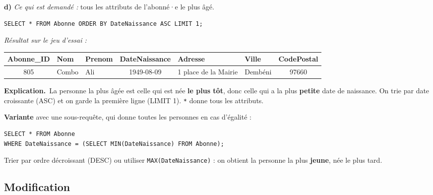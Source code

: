 \documentclass[11pt, a4paper]{exam}
\newcommand{\code}[1]{\texttt{#1}}
\newcommand{\rappel}[1]{\noindent\textit{Ce qui est demandé :} #1\par\smallskip}
\newcommand{\explication}{\noindent\textbf{Explication.}\ }
\newcommand{\sql}[1]{\textsc{#1}}
\newcommand{\resultat}[1]{\par\smallskip\noindent\textit{Résultat sur le jeu d'essai :}\par\nopagebreak\begin{center}\footnotesize #1\end{center}}
\begin{document}
\textbf{d)} \rappel{tous les attributs de l'abonné·e le plus âgé.}
\begin{reponse}
\begin{lstlisting}[style=sqlc]
SELECT * FROM Abonne ORDER BY DateNaissance ASC LIMIT 1;
\end{lstlisting}
\end{reponse}
\resultat{\begin{tabular}{|c|l|l|c|l|l|c|}\hline Abonne\_ID & Nom & Prenom & DateNaissance & Adresse & Ville & CodePostal \\\hline 805 & Combo & Ali & 1949-08-09 & 1 place de la Mairie & Dembéni & 97660 \\\hline\end{tabular}}
\explication La personne la plus âgée est celle qui est née \textbf{le plus tôt}, donc celle qui a la plus \textbf{petite} date de naissance. On trie par date croissante (\sql{ASC}) et on garde la première ligne (\sql{LIMIT} 1). \code{*} donne tous les attributs.

\textbf{Variante} avec une sous-requête, qui donne toutes les personnes en cas d'égalité :
\begin{lstlisting}[style=sqlc]
SELECT * FROM Abonne
WHERE DateNaissance = (SELECT MIN(DateNaissance) FROM Abonne);
\end{lstlisting}

\begin{erreur}
Trier par ordre décroissant (\sql{DESC}) ou utiliser \code{MAX(DateNaissance)} : on obtient la personne la plus \textbf{jeune}, née le plus tard.
\end{erreur}

\subsection*{Modification}
\end{document}
